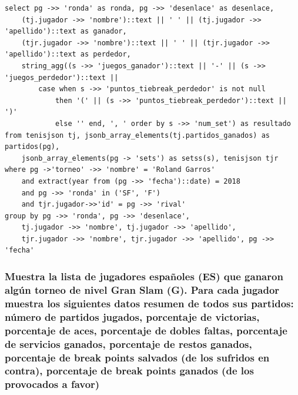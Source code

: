 \documentclass[11pt]{opticajnl}
\begin{document}
\begin{verbatim}
select pg ->> 'ronda' as ronda, pg ->> 'desenlace' as desenlace, 
	(tj.jugador ->> 'nombre')::text || ' ' || (tj.jugador ->> 'apellido')::text as ganador, 
	(tjr.jugador ->> 'nombre')::text || ' ' || (tjr.jugador ->> 'apellido')::text as perdedor, 
	string_agg((s ->> 'juegos_ganador')::text || '-' || (s ->> 'juegos_perdedor')::text || 
		case when s ->> 'puntos_tiebreak_perdedor' is not null 
			then '(' || (s ->> 'puntos_tiebreak_perdedor')::text || ')' 
			else '' end, ', ' order by s ->> 'num_set') as resultado
from tenisjson tj, jsonb_array_elements(tj.partidos_ganados) as partidos(pg), 
	jsonb_array_elements(pg -> 'sets') as setss(s), tenisjson tjr
where pg ->'torneo' ->> 'nombre' = 'Roland Garros'
    and extract(year from (pg ->> 'fecha')::date) = 2018
    and pg ->> 'ronda' in ('SF', 'F')
    and tjr.jugador->>'id' = pg ->> 'rival'
group by pg ->> 'ronda', pg ->> 'desenlace', 
	tj.jugador ->> 'nombre', tj.jugador ->> 'apellido', 
	tjr.jugador ->> 'nombre', tjr.jugador ->> 'apellido', pg ->> 'fecha'
\end{verbatim}





\subsubsection{Muestra la lista de jugadores españoles (ES) que ganaron algún torneo de nivel Gran Slam (G). Para cada jugador muestra los siguientes datos resumen de todos sus partidos: número de partidos jugados, porcentaje de victorias, porcentaje de aces, porcentaje de dobles faltas, porcentaje de servicios ganados, porcentaje de restos ganados, porcentaje de break points salvados (de los sufridos en contra), porcentaje de break points ganados (de los provocados a favor)}
\end{document}
